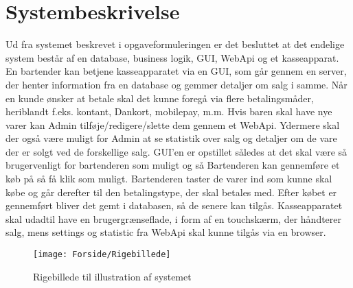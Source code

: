 \chapter{Systembeskrivelse}
Ud fra systemet beskrevet i opgaveformuleringen er det besluttet at det endelige system består af en database, business logik, \gls{GUI}, \gls{WebApi} og et kasseapparat. 
\newline
\newline
En bartender kan betjene kasseapparatet via en GUI, som går gennem en server, der henter information fra en database og gemmer detaljer om salg i samme.
Når en kunde ønsker at betale skal det kunne foregå via flere betalingsmåder, heriblandt f.eks. kontant, Dankort, mobilepay, m.m.
\newline
\newline
Hvis baren skal have nye varer kan Admin tilføje/redigere/slette dem gennem et \gls{WebApi}. Ydermere skal der også være muligt for Admin at se statistik over salg og detaljer om de vare der er solgt ved de forskellige salg. 
\newline
\newline
\gls{GUI}'en er opstillet således at det skal være så brugervenligt for bartenderen som muligt og så Bartenderen kan gennemføre et køb på så få klik som muligt. Bartenderen taster de varer ind som kunne skal købe og går derefter til den betalingstype, der skal betales med. Efter købet er gennemført bliver det gemt i databasen, så de senere kan tilgås. 
\newline
\newline
Kasseapparatet skal udadtil have en brugergrænseflade, i form af en touchskærm, der håndterer salg, mens settings og statistic fra \gls{WebApi} skal kunne tilgås via en browser. 
                  
\begin{figure}[h]
    \centering
    \texttt{[image: Forside/Rigebillede]}
    \caption{Rigebillede til illustration af systemet}
    \label{fig:rig_billede}
\end{figure} 


